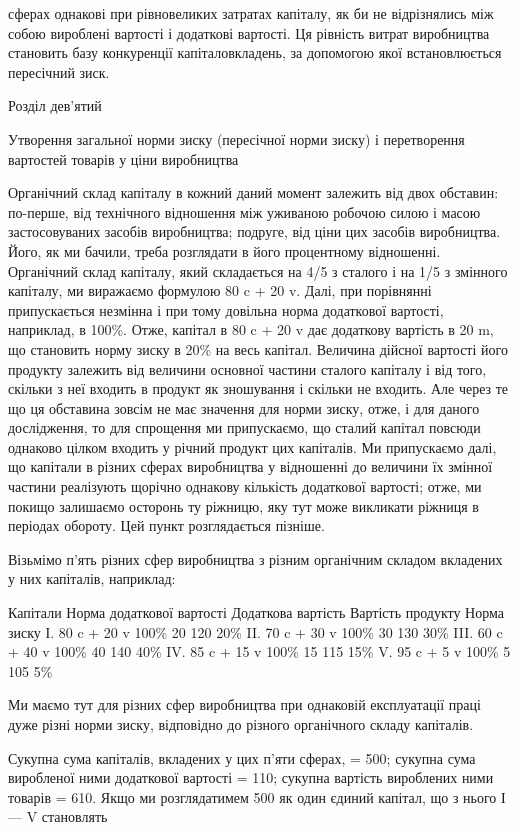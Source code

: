 \parcont{}  %
сферах однакові при рівновеликих затратах капіталу, як би не
відрізнялись між собою вироблені вартості і додаткові вартості.
Ця рівність витрат виробництва становить базу конкуренції капіталовкладень, за допомогою якої
встановлюється пересічний зиск.

Розділ дев’ятий

Утворення загальної норми зиску (пересічної норми зиску) і перетворення вартостей товарів у ціни
виробництва

Органічний склад капіталу в кожний даний момент залежить
від двох обставин: по-перше, від технічного відношення між уживаною робочою силою і масою
застосовуваних засобів виробництва; подруге, від ціни цих засобів виробництва. Його, як ми бачили,
треба розглядати в його процентному відношенні. Органічний склад капіталу, який складається на 4/5 з
сталого і на 1/5 з змінного капіталу, ми виражаємо формулою 80 c + 20 v. Далі, при
порівнянні припускається незмінна і при тому довільна норма
додаткової вартості, наприклад, в 100\%. Отже, капітал в 80 c + 20 v дає додаткову вартість в 20 m,
що становить норму зиску
в 20\% на весь капітал. Величина дійсної вартості його продукту
залежить від величини основної частини сталого капіталу і від
того, скільки з неї входить в продукт як зношування і скільки
не входить. Але через те що ця обставина зовсім не має значення для норми зиску, отже, і для даного
дослідження, то для
спрощення ми припускаємо, що сталий капітал повсюди однаково цілком входить у річний продукт цих
капіталів. Ми припускаємо далі, що капітали в різних сферах виробництва у
відношенні до величини їх змінної частини реалізують щорічно
однакову кількість додаткової вартості; отже, ми покищо залишаємо осторонь ту ріжницю, яку тут може
викликати ріжниця
в періодах обороту. Цей пункт розглядається пізніше.

Візьмімо п’ять різних сфер виробництва з різним органічним
складом вкладених у них капіталів, наприклад:

Капітали    Норма додаткової вартості    Додаткова  вартість    Вартість продукту   Норма  зиску
І. 80 c + 20 v    100\%    20    120    20\%
II. 70 c + 30 v   100\%    30    130    30\%
III. 60 c + 40 v   100\%    40   140    40\%
IV. 85 c + 15 v   100\%    15    115    15\%
V. 95 c + 5 v     100\%    5    105    5\%

Ми маємо тут для різних сфер виробництва при однаковій
експлуатації праці дуже різні норми зиску, відповідно до різного органічного складу капіталів.

Сукупна сума капіталів, вкладених у цих п’яти сферах, = 500;
сукупна сума виробленої ними додаткової вартості = 110; сукупна вартість вироблених ними товарів =
610. Якщо ми розглядатимем 500 як один єдиний капітал, що з нього І — V становлять
\parbreak{}  %
